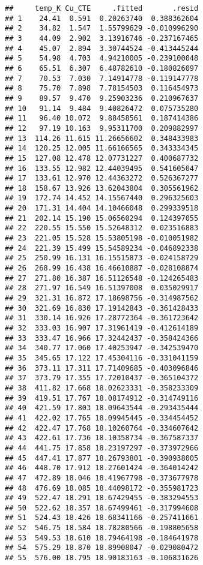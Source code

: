 \documentclass[]{book}
\theoremstyle{definition}
\theoremstyle{definition}
\theoremstyle{definition}
\theoremstyle{remark}
\begin{document}
\begin{verbatim}
##     temp_K Cu_CTE     .fitted       .resid
## 1    24.41  0.591  0.20263740  0.388362604
## 2    34.82  1.547  1.55799629 -0.010996290
## 3    44.09  2.902  3.13916746 -0.237167465
## 4    45.07  2.894  3.30744524 -0.413445244
## 5    54.98  4.703  4.94210005 -0.239100048
## 6    65.51  6.307  6.48782610 -0.180826097
## 7    70.53  7.030  7.14914778 -0.119147778
## 8    75.70  7.898  7.78154503  0.116454973
## 9    89.57  9.470  9.25903236  0.210967637
## 10   91.14  9.484  9.40826472  0.075735280
## 11   96.40 10.072  9.88458561  0.187414386
## 12   97.19 10.163  9.95311700  0.209882997
## 13  114.26 11.615 11.26656602  0.348433983
## 14  120.25 12.005 11.66166565  0.343334345
## 15  127.08 12.478 12.07731227  0.400687732
## 16  133.55 12.982 12.44039495  0.541605047
## 17  133.61 12.970 12.44363272  0.526367277
## 18  158.67 13.926 13.62043804  0.305561962
## 19  172.74 14.452 14.15567440  0.296325603
## 20  171.31 14.404 14.10466048  0.299339518
## 21  202.14 15.190 15.06560294  0.124397055
## 22  220.55 15.550 15.52648312  0.023516883
## 23  221.05 15.528 15.53805198 -0.010051982
## 24  221.39 15.499 15.54589234 -0.046892338
## 25  250.99 16.131 16.15515873 -0.024158729
## 26  268.99 16.438 16.46610887 -0.028108874
## 27  271.80 16.387 16.51126548 -0.124265483
## 28  271.97 16.549 16.51397008  0.035029917
## 29  321.31 16.872 17.18698756 -0.314987562
## 30  321.69 16.830 17.19142843 -0.361428433
## 31  330.14 16.926 17.28772364 -0.361723642
## 32  333.03 16.907 17.31961419 -0.412614189
## 33  333.47 16.966 17.32442437 -0.358424366
## 34  340.77 17.060 17.40253947 -0.342539470
## 35  345.65 17.122 17.45304116 -0.331041159
## 36  373.11 17.311 17.71409685 -0.403096846
## 37  373.79 17.355 17.72010437 -0.365104372
## 38  411.82 17.668 18.02623331 -0.358233309
## 39  419.51 17.767 18.08174912 -0.314749116
## 40  421.59 17.803 18.09643544 -0.293435444
## 41  422.02 17.765 18.09945445 -0.334454452
## 42  422.47 17.768 18.10260764 -0.334607642
## 43  422.61 17.736 18.10358734 -0.367587337
## 44  441.75 17.858 18.23197297 -0.373972966
## 45  447.41 17.877 18.26793801 -0.390938005
## 46  448.70 17.912 18.27601424 -0.364014242
## 47  472.89 18.046 18.41967798 -0.373677978
## 48  476.69 18.085 18.44098172 -0.355981723
## 49  522.47 18.291 18.67429455 -0.383294553
## 50  522.62 18.357 18.67499461 -0.317994608
## 51  524.43 18.426 18.68341166 -0.257411661
## 52  546.75 18.584 18.78280566 -0.198805658
## 53  549.53 18.610 18.79464198 -0.184641978
## 54  575.29 18.870 18.89908047 -0.029080472
## 55  576.00 18.795 18.90183163 -0.106831626

\end{verbatim}
\end{document}
